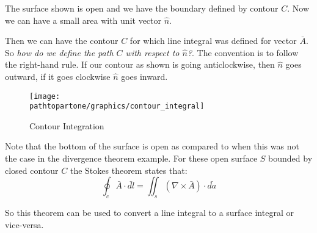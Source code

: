 
The surface shown is open and we have the boundary defined by contour $C$. Now we can have a small area with unit vector $\hat n$.

Then we can have the contour $C$ for which line integral was defined for vector $\bar{A}$. So \emph{how do we define the path $C$ with respect to $\hat{n}$?}. The convention is to follow the right-hand rule. If our contour as shown is going anticlockwise, then $\hat n$ goes outward, if it goes clockwise $\hat n$ goes inward.

\begin{figure}
\centering
\texttt{[image: \\pathtopartone/graphics/contour\_integral]}
\caption{Contour Integration}
\end{figure}

Note that the bottom of the surface is open as compared to when this was not the case in the divergence theorem example. For these open surface $S$ bounded by closed contour $C$ the Stokes theorem states that:
\begin{equation}
\oint_c \bar{A} \cdot \bar{dl} = \iint_s  (\nabla \times \bar{A})\cdot\bar{da}
\end{equation}

So this theorem can be used to convert a line integral to a surface integral or vice-versa.

